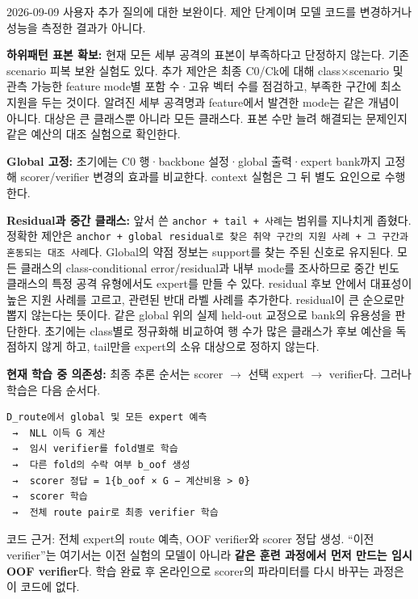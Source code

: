2026-09-09 사용자 추가 질의에 대한 보완이다. 제안 단계이며 모델 코드를 변경하거나 성능을 측정한 결과가 아니다.

\par\noindent \textbullet\enspace \textbf{하위패턴 표본 확보:} 현재 모든 세부 공격의 표본이 부족하다고 단정하지 않는다. 기존 scenario 피복 보완 실험도 있다. 추가 제안은 최종 C0/\allowbreak{}Ck에 대해 class×scenario 및 관측 가능한 feature mode별 포함 수·고유 벡터 수를 점검하고, 부족한 구간에 최소 지원을 두는 것이다. 알려진 세부 공격명과 feature에서 발견한 mode는 같은 개념이 아니다. 대상은 큰 클래스뿐 아니라 모든 클래스다. 표본 수만 늘려 해결되는 문제인지 같은 예산의 대조 실험으로 확인한다.


\par\noindent \textbullet\enspace \textbf{Global 고정:} 초기에는 C0 행·backbone 설정·global 출력·expert bank까지 고정해 scorer/\allowbreak{}verifier 변경의 효과를 비교한다. context 실험은 그 뒤 별도 요인으로 수행한다.


\par\noindent \textbullet\enspace \textbf{Residual과 중간 클래스:} 앞서 쓴 \texttt{anchor +\allowbreak{}\allowbreak{} tail +\allowbreak{}\allowbreak{} \allowbreak{}사례}는 범위를 지나치게 좁혔다. 정확한 제안은 \texttt{anchor +\allowbreak{}\allowbreak{} global \allowbreak{}residual\allowbreak{}로 찾은 취약 \allowbreak{}구간의 지원 사\allowbreak{}례 +\allowbreak{}\allowbreak{} 그 구간\allowbreak{}과 혼동되는 대\allowbreak{}조 사례}다. Global의 약점 정보는 support를 찾는 주된 신호로 유지된다. 모든 클래스의 class-conditional error/\allowbreak{}residual과 내부 mode를 조사하므로 중간 빈도 클래스의 특정 공격 유형에서도 expert를 만들 수 있다. residual 후보 안에서 대표성이 높은 지원 사례를 고르고, 관련된 반대 라벨 사례를 추가한다. residual이 큰 순으로만 뽑지 않는다는 뜻이다. 같은 global 위의 실제 held-out 교정으로 bank의 유용성을 판단한다. 초기에는 class별로 정규화해 비교하여 행 수가 많은 클래스가 후보 예산을 독점하지 않게 하고, tail만을 expert의 소유 대상으로 정하지 않는다.


\par\noindent \textbullet\enspace \textbf{현재 학습 중 의존성:} 최종 추론 순서는 scorer \ensuremath{\rightarrow} 선택 expert \ensuremath{\rightarrow} verifier다. 그러나 학습은 다음 순서다.



\begin{Verbatim}[breaklines=true,breakanywhere=true,fontsize=\scriptsize]
D_route에서 global 및 모든 expert 예측
 →  NLL 이득 G 계산
 →  임시 verifier를 fold별로 학습
 →  다른 fold의 수락 여부 b_oof 생성
 →  scorer 정답 = 1{b_oof × G − 계산비용 > 0}
 →  scorer 학습
 →  전체 route pair로 최종 verifier 학습

\end{Verbatim}
코드 근거: 전체 expert의 route 예측, OOF verifier와 scorer 정답 생성. “이전 verifier”는 여기서는 이전 실험의 모델이 아니라 \textbf{같은 훈련 과정에서 먼저 만드는 임시 OOF verifier}다. 학습 완료 후 온라인으로 scorer의 파라미터를 다시 바꾸는 과정은 이 코드에 없다.

